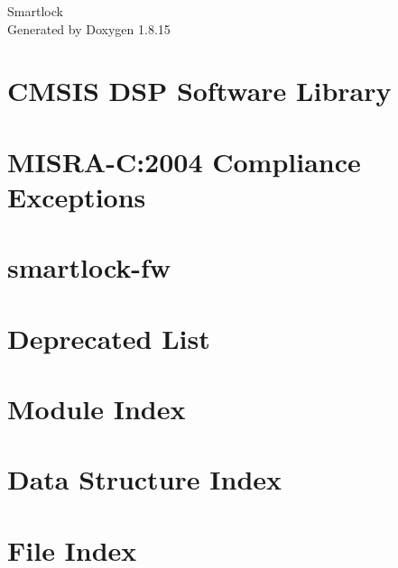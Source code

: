 \let\mypdfximage\pdfximage\def\pdfximage{\immediate\mypdfximage}\documentclass[twoside]{book}
\newcommand{\+}{\discretionary{\mbox{\scriptsize$\hookleftarrow$}}{}{}}
\newcommand{\clearemptydoublepage}{%
  \newpage{\pagestyle{empty}\cleardoublepage}%
}
\begin{document}
\hypersetup{pageanchor=false,
             bookmarksnumbered=true,
             pdfencoding=unicode
            }
\begin{titlepage}
\vspace*{7cm}
\begin{center}%
{\Large Smartlock }\\
\vspace*{1cm}
{\large Generated by Doxygen 1.8.15}\\
\end{center}
\end{titlepage}
\clearemptydoublepage
{}
\tableofcontents
\clearemptydoublepage
{}
\hypersetup{pageanchor=true}

\chapter{C\+M\+S\+IS D\+SP Software Library}
\label{index}\hypertarget{index}{}
\chapter{M\+I\+S\+R\+A-\/C\+:2004 Compliance Exceptions}
\label{_c_m_s_i_s__m_i_s_r_a__exceptions}

\chapter{smartlock-\/fw}
\label{md__r_e_a_d_m_e}

\chapter{Deprecated List}
\label{deprecated}

\chapter{Module Index}

\chapter{Data Structure Index}

\chapter{File Index}

\end{document}
